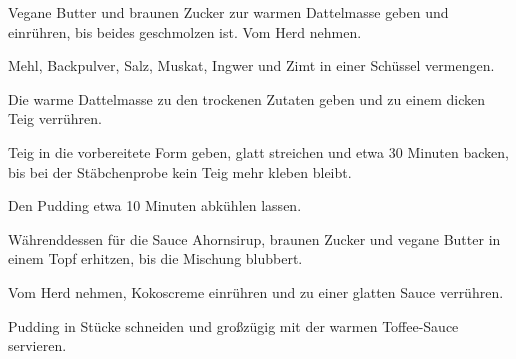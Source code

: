 \begin{recipe}
{    \step%
    Vegane Butter und braunen Zucker zur warmen Dattelmasse geben und einrühren, bis beides geschmolzen ist. Vom Herd nehmen.
    
    \step%
    Mehl, Backpulver, Salz, Muskat, Ingwer und Zimt in einer Schüssel vermengen.
    
    \step%
    Die warme Dattelmasse zu den trockenen Zutaten geben und zu einem dicken Teig verrühren.
    
    \step%
    Teig in die vorbereitete Form geben, glatt streichen und etwa 30 Minuten backen, bis bei der Stäbchenprobe kein Teig mehr kleben bleibt.
    
    \step%
    Den Pudding etwa 10 Minuten abkühlen lassen.
    
    \step%
    Währenddessen für die Sauce Ahornsirup, braunen Zucker und vegane Butter in einem Topf erhitzen, bis die Mischung blubbert.
    
    \step%
    Vom Herd nehmen, Kokoscreme einrühren und zu einer glatten Sauce verrühren.
    
    \step%
    Pudding in Stücke schneiden und großzügig mit der warmen Toffee-Sauce servieren.
}



\end{recipe}
